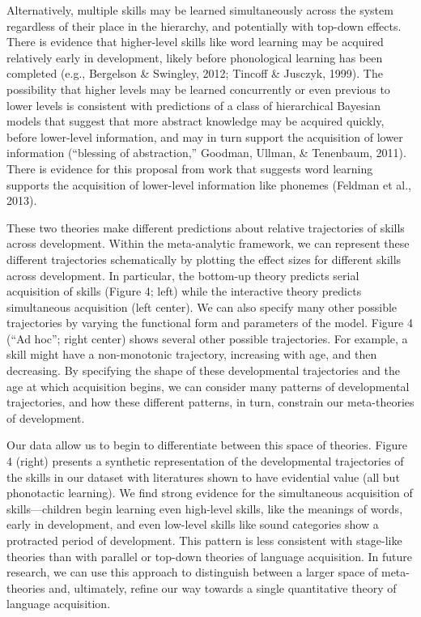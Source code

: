 \documentclass[english,floatsintext,man]{apa6}
\theoremstyle{definition}
\theoremstyle{definition}
\theoremstyle{remark}
\begin{document}
Alternatively, multiple skills may be learned simultaneously across the
system regardless of their place in the hierarchy, and potentially with
top-down effects. There is evidence that higher-level skills like word
learning may be acquired relatively early in development, likely before
phonological learning has been completed (e.g., Bergelson \& Swingley,
2012; Tincoff \& Jusczyk, 1999). The possibility that higher levels may
be learned concurrently or even previous to lower levels is consistent
with predictions of a class of hierarchical Bayesian models that suggest
that more abstract knowledge may be acquired quickly, before lower-level
information, and may in turn support the acquisition of lower
information (``blessing of abstraction,'' Goodman, Ullman, \& Tenenbaum,
2011). There is evidence for this proposal from work that suggests word
learning supports the acquisition of lower-level information like
phonemes (Feldman et al., 2013).

These two theories make different predictions about relative
trajectories of skills across development. Within the meta-analytic
framework, we can represent these different trajectories schematically
by plotting the effect sizes for different skills across development. In
particular, the bottom-up theory predicts serial acquisition of skills
(Figure 4; left) while the interactive theory predicts simultaneous
acquisition (left center). We can also specify many other possible
trajectories by varying the functional form and parameters of the model.
Figure 4 (\enquote{Ad hoc}; right center) shows several other possible
trajectories. For example, a skill might have a non-monotonic
trajectory, increasing with age, and then decreasing. By specifying the
shape of these developmental trajectories and the age at which
acquisition begins, we can consider many patterns of developmental
trajectories, and how these different patterns, in turn, constrain our
meta-theories of development.

Our data allow us to begin to differentiate between this space of
theories. Figure 4 (right) presents a synthetic representation of the
developmental trajectories of the skills in our dataset with literatures
shown to have evidential value (all but phonotactic learning). We find
strong evidence for the simultaneous acquisition of skills---children
begin learning even high-level skills, like the meanings of words, early
in development, and even low-level skills like sound categories show a
protracted period of development. This pattern is less consistent with
stage-like theories than with parallel or top-down theories of language
acquisition. In future research, we can use this approach to distinguish
between a larger space of meta-theories and, ultimately, refine our way
towards a single quantitative theory of language acquisition.
\end{document}
